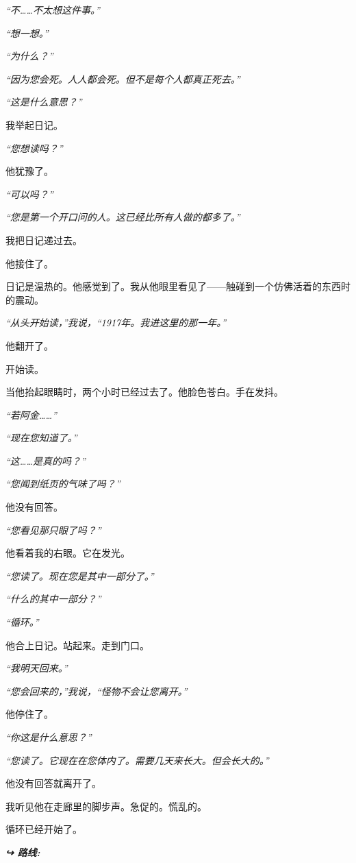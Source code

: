 \noindent \textit{“不……不太想这件事。”}

\noindent \textit{“想一想。”}

\noindent \textit{“为什么？”}

\noindent \textit{“因为您会死。人人都会死。但不是每个人都真正死去。”}

\noindent \textit{“这是什么意思？”}

\noindent 我举起日记。

\noindent \textit{“您想读吗？”}

\noindent 他犹豫了。

\noindent \textit{“可以吗？”}

\noindent \textit{“您是第一个开口问的人。这已经比所有人做的都多了。”}

\noindent 我把日记递过去。

\noindent 他接住了。

\noindent 日记是温热的。他感觉到了。我从他眼里看见了——触碰到一个仿佛活着的东西时的震动。

\noindent \textit{“从头开始读，”我说，“1917年。我进这里的那一年。”}

\noindent 他翻开了。

\noindent 开始读。

\noindent 当他抬起眼睛时，两个小时已经过去了。他脸色苍白。手在发抖。

\noindent \textit{“若阿金……”}

\noindent \textit{“现在您知道了。”}

\noindent \textit{“这……是真的吗？”}

\noindent \textit{“您闻到纸页的气味了吗？”}

\noindent 他没有回答。

\noindent \textit{“您看见那只眼了吗？”}

\noindent 他看着我的右眼。它在发光。

\noindent \textit{“您读了。现在您是其中一部分了。”}

\noindent \textit{“什么的其中一部分？”}

\noindent \textit{“循环。”}

\noindent 他合上日记。站起来。走到门口。

\noindent \textit{“我明天回来。”}

\noindent \textit{“您会回来的，”我说，“怪物不会让您离开。”}

\noindent 他停住了。

\noindent \textit{“你这是什么意思？”}

\noindent \textit{“您读了。它现在在您体内了。需要几天来长大。但会长大的。”}

\noindent 他没有回答就离开了。

\noindent 我听见他在走廊里的脚步声。急促的。慌乱的。

\noindent 循环已经开始了。

\vspace{0.5em}
\noindent\textit{\textbf{↪ 路线:}  \rotasep {} \rotasep {}}
